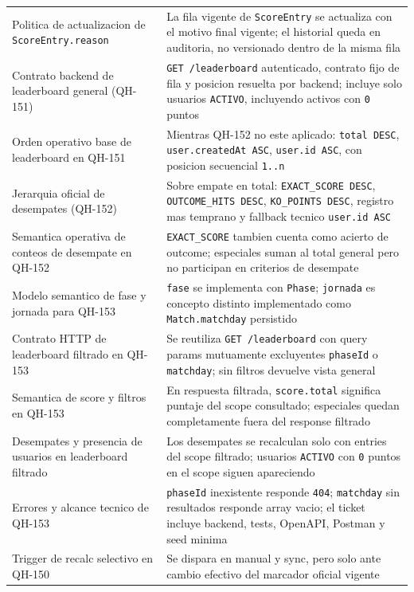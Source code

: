 \begin{longtable}{p{}p{}}
Politica de actualizacion de \texttt{ScoreEntry.reason} & La fila vigente de \texttt{ScoreEntry} se actualiza con el motivo final vigente; el historial queda en auditoria, no versionado dentro de la misma fila \\
Contrato backend de leaderboard general (QH-151) & \texttt{GET /leaderboard} autenticado, contrato fijo de fila y posicion resuelta por backend; incluye solo usuarios \texttt{ACTIVO}, incluyendo activos con \texttt{0} puntos \\
Orden operativo base de leaderboard en QH-151 & Mientras QH-152 no este aplicado: \texttt{total DESC}, \texttt{user.createdAt ASC}, \texttt{user.id ASC}, con posicion secuencial \texttt{1..n} \\
Jerarquia oficial de desempates (QH-152) & Sobre empate en total: \texttt{EXACT\_SCORE DESC}, \texttt{OUTCOME\_HITS DESC}, \texttt{KO\_POINTS DESC}, registro mas temprano y fallback tecnico \texttt{user.id ASC} \\
Semantica operativa de conteos de desempate en QH-152 & \texttt{EXACT\_SCORE} tambien cuenta como acierto de outcome; especiales suman al total general pero no participan en criterios de desempate \\
Modelo semantico de fase y jornada para QH-153 & \texttt{fase} se implementa con \texttt{Phase}; \texttt{jornada} es concepto distinto implementado como \texttt{Match.matchday} persistido \\
Contrato HTTP de leaderboard filtrado en QH-153 & Se reutiliza \texttt{GET /leaderboard} con query params mutuamente excluyentes \texttt{phaseId} o \texttt{matchday}; sin filtros devuelve vista general \\
Semantica de score y filtros en QH-153 & En respuesta filtrada, \texttt{score.total} significa puntaje del scope consultado; especiales quedan completamente fuera del response filtrado \\
Desempates y presencia de usuarios en leaderboard filtrado & Los desempates se recalculan solo con entries del scope filtrado; usuarios \texttt{ACTIVO} con \texttt{0} puntos en el scope siguen apareciendo \\
Errores y alcance tecnico de QH-153 & \texttt{phaseId} inexistente responde \texttt{404}; \texttt{matchday} sin resultados responde array vacio; el ticket incluye backend, tests, OpenAPI, Postman y seed minima \\
Trigger de recalc selectivo en QH-150 & Se dispara en manual y sync, pero solo ante cambio efectivo del marcador oficial vigente \\

\end{longtable}
